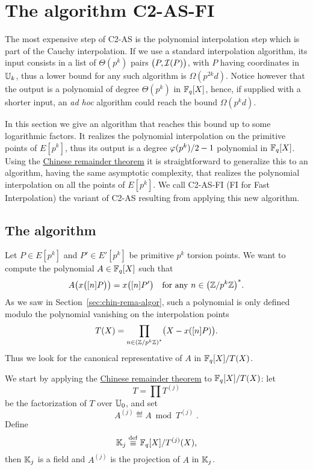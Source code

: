 \section{The algorithm C2-AS-FI}
\label{sec:C2-AS-FI}

The most expensive step of C2-AS is the polynomial interpolation step
which is part of the Cauchy interpolation. If we use a standard
interpolation algorithm, its input consists in a list of $\Theta(p^k)$
pairs $\bigl(P, \mathcal{I}(P)\bigr)$, with $P$ having coordinates in $\mathbb{U}_k$,
thus a lower bound for any such algorithm is $\Omega(p^{2k}d)$. Notice
however that the output is a polynomial of degree $\Theta(p^k)$ in
$\mathbb{F}_q[X]$, hence, if supplied with a shorter input, an \emph{ad hoc}
algorithm could reach the bound $\Omega(p^kd)$.

In this section we give an algorithm that reaches this bound up to
some logarithmic factors. It realizes the polynomial interpolation on
the primitive points of $E[p^k]$, thus its output is a degree
$\varphi(p^k)/2-1$ polynomial in $\mathbb{F}_q[X]$. Using the
\hyperref[th:chinese-remainder]{Chinese remainder theorem} it is
straightforward to generalize this to an algorithm, having the same
asymptotic complexity, that realizes the polynomial interpolation on
all the points of $E[p^k]$. We call C2-AS-FI (FI for Fast
Interpolation) the variant of C2-AS resulting from applying this new
algorithm.


\subsection{The algorithm}
Let $P\in E[p^k]$ and $P'\in E'[p^k]$ be primitive $p^k$ torsion
points. We want to compute the polynomial $A\in\mathbb{F}_q[X]$ such that
\begin{equation}
  A\bigl(x\bigl([n]P\bigr)\bigr) = x\bigl([n]P'\bigr)
  \quad\text{for any $n\in\left(\mathbb{Z}/p^k\mathbb{Z}\right)^\ast$.}
\end{equation}
As we saw in Section~\ref{sec:chin-rema-algor}, such a polynomial is
only defined modulo the polynomial vanishing on the interpolation
points
\begin{equation}
  T(X) = \prod_{n\in\left(\mathbb{Z}/p^k\mathbb{Z}\right)^\ast} \bigl(X - x([n]P)\bigr)
  \text{.}
\end{equation}
Thus we look for the canonical representative of $A$ in $\mathbb{F}_q[X]/T(X)$.

We start by applying the \hyperref[th:chinese-remainder]{Chinese
  remainder theorem} to $\mathbb{F}_q[X]/T(X)$: let
\begin{equation}
  \label{eq:T}
  T = \prod T^{(j)}
\end{equation}
be the factorization of $T$ over $\mathbb{U}_0$, and set
\begin{equation}
  \label{eq:A}
  A^{(j)} \eqdef A \bmod T^{(j)}
  \;\text{.}
\end{equation}
Define
\begin{equation}
  \label{eq:187}
  \mathbb{K}_j\overset{\mathrm{def}}{\equiv}\mathbb{F}_q[X]/T^{(j)}(X)  
  \text{,}
\end{equation}
then $\mathbb{K}_j$ is a field and $A^{(j)}$ is the projection of $A$ in
$\mathbb{K}_j$.

